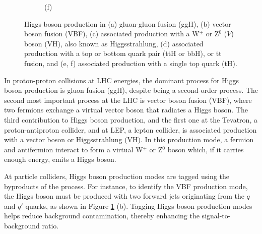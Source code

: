\begin{figure}[!ht]
\begin{subfigure}[t]{0.33\mylength}
            \setlength{\unitlength}{0.25\mylength}
            \caption{\footnotesize (f)}
    \end{subfigure}%
    \vspace*{-0.0cm}
    \caption{Higgs boson production in (a) gluon-gluon fusion (ggH), (b) vector boson fusion (VBF), (c) associated production with a W$^{\pm}$ or Z$^0$ ($V$) boson (VH), also known as Higgsstrahlung, (d) associated production with a top or bottom quark pair (ttH or bbH), or tt fusion, and (e, f) associated production with a single top quark (tH).}
    \label{fig:Higgs_production}
    \vspace*{-0.0cm}
\end{figure}

In proton-proton collisions at LHC energies, the dominant process for Higgs boson production is gluon fusion (ggH), despite being a second-order process. The second most important process at the LHC is vector boson fusion (VBF), where two fermions exchange a virtual vector boson that radiates a Higgs boson. The third contribution to Higgs boson production, and the first one at the Tevatron, a proton-antiproton collider, and at LEP, a lepton collider, is associated production with a vector boson or Higgsstrahlung (VH). In this production mode, a fermion and antifermion interact to form a virtual W$^{\pm}$ or Z$^0$ boson which, if it carries enough energy, emits a Higgs boson.

At particle colliders, Higgs boson production modes are tagged using the byproducts of the process. For instance, to identify the VBF production mode, the Higgs boson must be produced with two forward jets originating from the $q$ and $q'$ quarks, as shown in Figure \ref{fig:Higgs_production} (b). Tagging Higgs boson production modes helps reduce background contamination, thereby enhancing the signal-to-background ratio.

